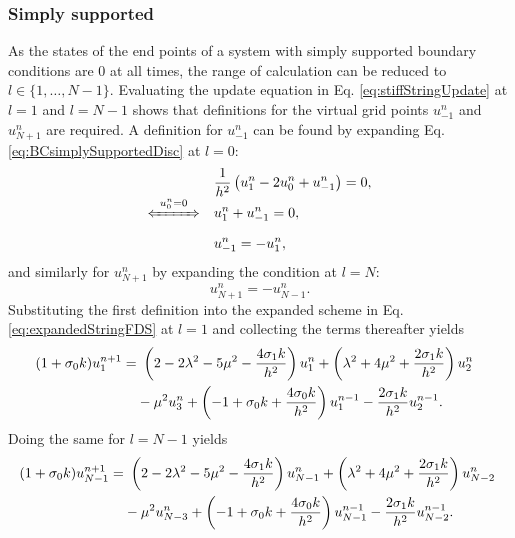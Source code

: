 \subsubsection{Simply supported}
As the states of the end points of a system with simply supported boundary conditions are $0$ at all times, the range of calculation can be reduced to $l\in \{ 1, \hdots, N-1\}$. Evaluating the update equation in Eq. \eqref{eq:stiffStringUpdate} at $l=1$ and $l=N-1$ shows that definitions for the virtual grid points $u_{-1}^n$ and $u_{N+1}^n$ are required. A definition for $u_{-1}^n$ can be found by expanding Eq. \eqref{eq:BCsimplySupportedDisc} at $l = 0$:
\begin{align}
    &\frac{1}{h^2}\left(u_1^n - 2 u_0^n + u_{-1}^n\right) = 0,\nonumber\\[-1em]
    \xLeftrightarrow{\mystrut\ u^n_0 = 0\ } \quad & u_1^n + u_{-1}^n = 0,\nonumber\\[0.25em]
    &u_{-1}^n = -u_1^n,\label{eq:simplySupportedResult}
\end{align}
and similarly for $u_{N+1}^n$ by expanding the condition at $l=N$:
\begin{equation*}
    u_{N+1}^n = -u_{N-1}^n.
\end{equation*}
Substituting the first definition into the expanded scheme in Eq. \eqref{eq:expandedStringFDS} at $l=1$ and collecting the terms thereafter yields
\begin{equation}
    \begin{aligned}
        \!\!\!\!\!(1+\sigma_{0} k) u_1^{n+1} =&\ \left(2 - 2\lambda^2 - 5\mu^2 - \frac{4\sigma_{1} k}{h^2}\right) u_1^n + \left(\lambda^2 + 4\mu^2 + \frac{2\sigma_{1} k}{h^2}\right) u_{2}^n \\
        &-\mu^2u_3^n+ \left(-1+\sigma_{0} k + \frac{4\sigma_{0} k}{h^2}\right)u_1^{n-1} - \frac{2\sigma_{1} k}{h^2}u_{2}^{n-1}.
    \end{aligned}
\end{equation}
Doing the same for $l=N-1$ yields
\begin{equation}
    \begin{aligned}
        \!\!(1+\sigma_{0} k) u_{N-1}^{n+1} =&\ \left(2 - 2\lambda^2 - 5\mu^2 - \frac{4\sigma_{1} k}{h^2}\right) u_{N-1}^n + \left(\lambda^2 + 4\mu^2 + \frac{2\sigma_{1} k}{h^2}\right) u_{N-2}^n \\
        &-\mu^2u_{N-3}^n+ \left(-1+\sigma_{0} k + \frac{4\sigma_{0} k}{h^2}\right)u_{N-1}^{n-1} - \frac{2\sigma_{1} k}{h^2}u_{N-2}^{n-1}.
    \end{aligned}
\end{equation}

